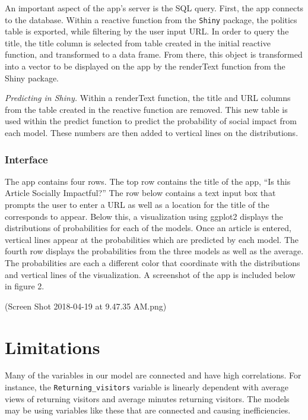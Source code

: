 \documentclass[10pt,letterpaper]{article}
\begin{document}
An important aspect of the app's server is the SQL query. First, the app
connects to the database. Within a reactive function from the
\texttt{Shiny} package, the politics table is exported, while filtering
by the user input URL. In order to query the title, the title column is
selected from table created in the initial reactive function, and
transformed to a data frame. From there, this object is transformed into
a vector to be displayed on the app by the renderText function from the
Shiny package.

\emph{Predicting in Shiny.} Within a renderText function, the title and
URL columns from the table created in the reactive function are removed.
This new table is used within the predict function to predict the
probability of social impact from each model. These numbers are then
added to vertical lines on the distributions.

\subsubsection{Interface}\label{interface}

The app contains four rows. The top row contains the title of the app,
``Is this Article Socially Impactful?'' The row below contains a text
input box that prompts the user to enter a URL as well as a location for
the title of the corresponds to appear. Below this, a visualization
using ggplot2 displays the distributions of probabilities for each of
the models. Once an article is entered, vertical lines appear at the
probabilities which are predicted by each model. The fourth row displays
the probabilities from the three models as well as the average. The
probabilities are each a different color that coordinate with the
distributions and vertical lines of the visualization. A screenshot of
the app is included below in figure 2.

(Screen Shot 2018-04-19 at 9.47.35 AM.png)

\section{Limitations}\label{limitations}

Many of the variables in our model are connected and have high
correlations. For instance, the \texttt{Returning\_visitors} variable is
linearly dependent with average views of returning visitors and average
minutes returning visitors. The models may be using variables like these
that are connected and causing inefficiencies.
\end{document}
